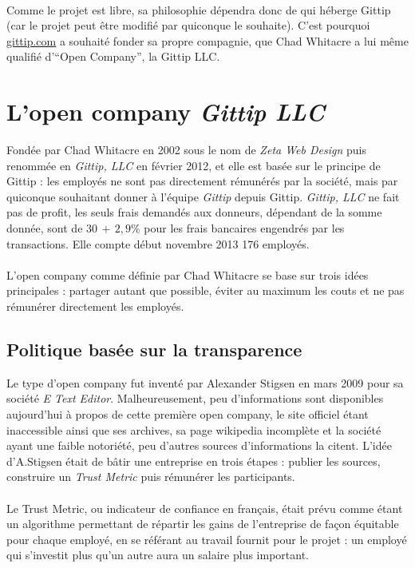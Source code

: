 \paragraph{}
Comme le projet est libre, sa philosophie dépendra donc de qui héberge Gittip
(car le projet peut être modifié par quiconque le souhaite). C'est pourquoi
\url{gittip.com} a souhaité fonder sa propre compagnie, que Chad Whitacre a lui
même qualifié d'``Open Company'', la Gittip LLC.


    \section{L'open company \emph{Gittip LLC}}

Fondée par Chad Whitacre en 2002 sous le nom de \emph{Zeta Web Design} puis
renommée en \emph{Gittip, LLC} en février 2012, et elle est basée sur le
principe de Gittip : les employés ne sont pas directement rémunérés par la
société, mais par quiconque souhaitant donner à l'équipe \emph{Gittip} depuis
Gittip. \emph{Gittip, LLC} ne fait pas de profit, les seuls frais demandés aux
donneurs, dépendant de la somme donnée, sont de $30$\textcent $\, + \, 2,9\%{}$
pour les frais bancaires engendrés par les transactions. Elle compte
début novembre 2013 176 employés.

\paragraph{}
L'open company comme définie par Chad Whitacre se base sur trois idées
principales : partager autant que possible, éviter au maximum les couts et ne
pas rémunérer directement les employés.

    \subsection{Politique basée sur la transparence}

Le type d'open company fut inventé par Alexander Stigsen en mars 2009 pour sa
société \emph{E Text Editor}. Malheureusement, peu d'informations sont
disponibles aujourd'hui à propos de cette première open company, le site
officiel étant inaccessible ainsi que ses archives, sa page wikipedia
incomplète et la société ayant une faible notoriété, peu d'autres sources
d'informations la citent. L'idée d'A.Stigsen était de bâtir une entreprise en
trois étapes : publier les sources, construire un \emph{Trust Metric} puis
rémunérer les participants.

\paragraph{}
Le Trust Metric, ou indicateur de confiance en français, était prévu comme
étant un algorithme permettant de répartir les gains de l'entreprise
de façon équitable pour chaque employé, en se référant au travail fournit pour
le projet : un employé qui s'investit plus qu'un autre aura un salaire plus
important.

